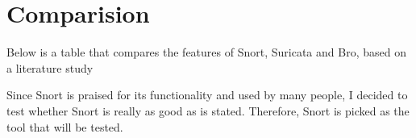 \section{Comparision}

Below is a table that compares the features of Snort, Suricata and Bro, based on a literature study \citep{Comp1, Comp2, Comp3}



Since Snort is praised for its functionality and used by many people, I decided to test whether Snort is really as good as is stated. Therefore, Snort is picked as the tool that will be tested.